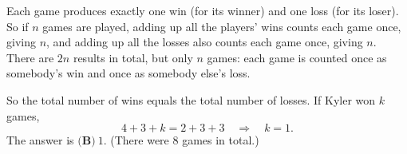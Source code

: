 Each game produces exactly one win (for its winner) and one loss (for its loser). So if $n$ games are played, adding up all the players' wins counts each game once, giving $n$, and adding up all the losses also counts each game once, giving $n$. There are $2n$ results in total, but only $n$ games: each game is counted once as somebody's win and once as somebody else's loss.

So the total number of wins equals the total number of losses. If Kyler won $k$ games,
\[
4+3+k=2+3+3\quad\Longrightarrow\quad k=1 .
\]
The answer is $\boxed{\textbf{(B)}\ 1}$. (There were $8$ games in total.)
